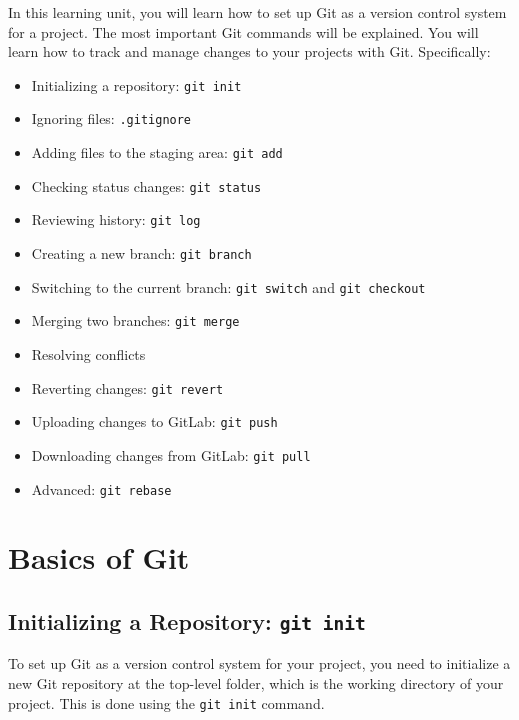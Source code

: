 \documentclass[
  letterpaper,
  DIV=11,
  numbers=noendperiod]{scrreprt}
\providecommand{\tightlist}{%
  \setlength{\itemsep}{0pt}\setlength{\parskip}{0pt}}\usepackage{longtable,booktabs,array}
\begin{document}
In this learning unit, you will learn how to set up Git as a version
control system for a project. The most important Git commands will be
explained. You will learn how to track and manage changes to your
projects with Git. Specifically:

\begin{itemize}
\tightlist
\item
  Initializing a repository: \texttt{git\ init}
\item
  Ignoring files: \texttt{.gitignore}
\item
  Adding files to the staging area: \texttt{git\ add}
\item
  Checking status changes: \texttt{git\ status}
\item
  Reviewing history: \texttt{git\ log}
\item
  Creating a new branch: \texttt{git\ branch}
\item
  Switching to the current branch: \texttt{git\ switch} and
  \texttt{git\ checkout}
\item
  Merging two branches: \texttt{git\ merge}
\item
  Resolving conflicts
\item
  Reverting changes: \texttt{git\ revert}
\item
  Uploading changes to GitLab: \texttt{git\ push}
\item
  Downloading changes from GitLab: \texttt{git\ pull}
\item
  Advanced: \texttt{git\ rebase}
\end{itemize}

\section{Basics of Git}\label{basics-of-git}

\subsection{\texorpdfstring{Initializing a Repository:
\texttt{git\ init}}{Initializing a Repository: git init}}\label{initializing-a-repository-git-init}

To set up Git as a version control system for your project, you need to
initialize a new Git repository at the top-level folder, which is the
working directory of your project. This is done using the
\texttt{git\ init} command.
\end{document}
